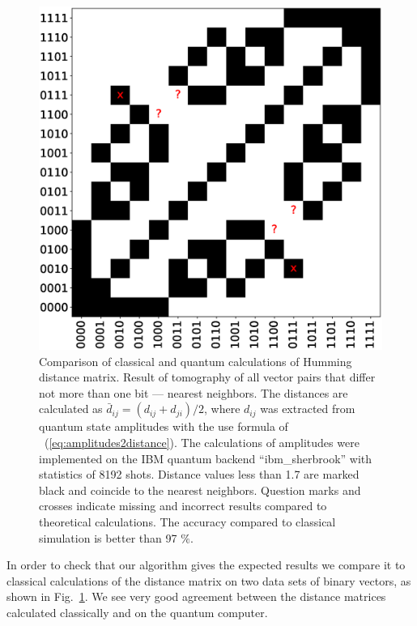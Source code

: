 \documentclass[%
  pra, aps, physrev,
  showkeys,
  twocolumn,
  showpacs,
  superscriptaddress,
  amsmath,amssymb,
  10pt
]{revtex4-2}
\begin{document}
\begin{figure}[t]
  \includegraphics[width=\columnwidth]{distance_matrix.eps}
  \caption{%
    Comparison of classical and quantum calculations of Humming distance matrix. Result of tomography of all vector pairs that differ not more than one bit --- nearest neighbors.  The distances are calculated as $\bar d_{ij} = (d_{ij} + d_{ji}) / 2$,
    where $d_{ij}$ was extracted from quantum state amplitudes with the use formula of ~(\ref{eq:amplitudes2distance}).
    The calculations of amplitudes were implemented on the IBM quantum backend ``ibm\_sherbrook'' with statistics of 8192 shots. Distance values less than 1.7 are marked black and coincide to the nearest neighbors.
    Question marks and crosses indicate missing and incorrect results compared to theoretical calculations.
    The accuracy compared to classical simulation is better than 97 $\%$.
  }
  \label{fig:distance_matrix}
\end{figure}



In order to check that our algorithm gives the expected results we compare it to classical calculations of the distance matrix on two data sets of binary vectors, as shown in Fig.~\ref{fig:distance_matrix}.
We see very good agreement between the distance matrices calculated classically and on the quantum computer.
\end{document}

